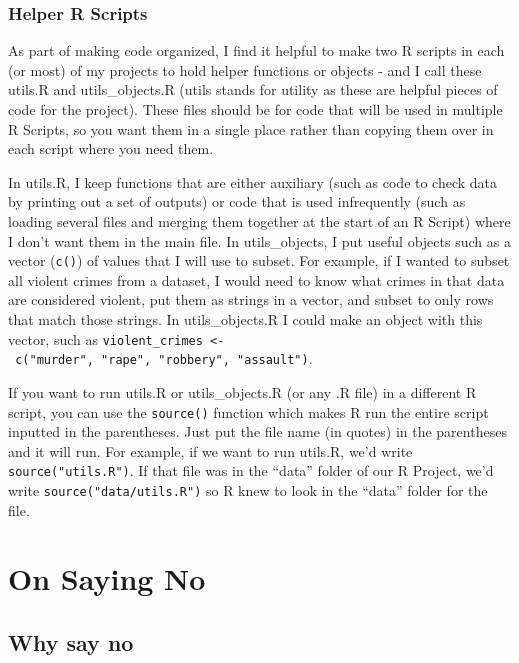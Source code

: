 \documentclass[
  12pt,
]{book}
\begin{document}
\hypertarget{helper-r-scripts}{%
\subsection{Helper R Scripts}\label{helper-r-scripts}}

As part of making code organized, I find it helpful to make two R scripts in each (or most) of my projects to hold helper functions or objects - and I call these utils.R and utils\_objects.R (utils stands for utility as these are helpful pieces of code for the project). These files should be for code that will be used in multiple R Scripts, so you want them in a single place rather than copying them over in each script where you need them.

In utils.R, I keep functions that are either auxiliary (such as code to check data by printing out a set of outputs) or code that is used infrequently (such as loading several files and merging them together at the start of an R Script) where I don't want them in the main file. In utils\_objects, I put useful objects such as a vector (\texttt{c()}) of values that I will use to subset. For example, if I wanted to subset all violent crimes from a dataset, I would need to know what crimes in that data are considered violent, put them as strings in a vector, and subset to only rows that match those strings. In utils\_objects.R I could make an object with this vector, such as \texttt{violent\_crimes\ \textless{}-\ c("murder",\ "rape",\ "robbery",\ "assault")}.

If you want to run utils.R or utils\_objects.R (or any .R file) in a different R script, you can use the \texttt{source()} function which makes R run the entire script inputted in the parentheses. Just put the file name (in quotes) in the parentheses and it will run. For example, if we want to run utils.R, we'd write \texttt{source("utils.R")}. If that file was in the ``data'' folder of our R Project, we'd write \texttt{source("data/utils.R")} so R knew to look in the ``data'' folder for the file.

\hypertarget{on-saying-no}{%
\chapter{On Saying No}\label{on-saying-no}}

\hypertarget{why-say-no}{%
\section{Why say no}\label{why-say-no}}
\end{document}
